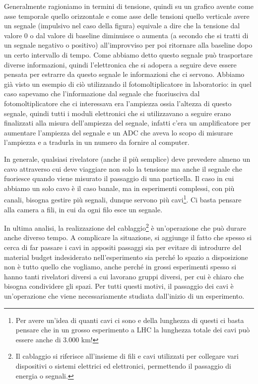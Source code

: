 Generalmente ragioniamo in termini di tensione, quindi su un grafico avente come asse temporale quello orizzontale e come asse delle tensioni quello verticale avere un segnale (impulsivo nel caso della figura) equivale a dire che la tensione dal valore 0 o dal valore di baseline diminuisce o aumenta (a secondo che si tratti di un segnale negativo o positivo) all'improvviso per poi ritornare alla baseline dopo un certo intervallo di tempo. Come abbiamo detto questo segnale può trasportare diverse informazioni, quindi l'elettronica che si adopera a seguire deve essere pensata per estrarre da questo segnale le informazioni che ci servono. Abbiamo già visto un esempio di ciò utilizzando il fotomoltiplicatore in laboratorio: in quel caso sapevamo che l'informazione dal segnale che fuoriusciva dal fotomoltiplicatore che ci interessava era l'ampiezza ossia l'altezza di questo segnale, quindi tutti i moduli elettronici che si utilizzavano a seguire erano finalizzati alla misura dell'ampiezza del segnale, infatti c'era un amplificatore per aumentare l'ampiezza del segnale e un ADC che aveva lo scopo di misurare l'ampiezza e a tradurla in un numero da fornire al computer.

In generale, qualsiasi rivelatore (anche il più semplice) deve prevedere almeno un cavo attraverso cui deve viaggiare non solo la tensione ma anche il segnale che fuoriesce quando viene misurato il passaggio di una particella. Il caso in cui abbiamo un solo cavo è il caso banale, ma in esperimenti complessi, con più canali, bisogna gestire più segnali, dunque servono più cavi\footnote{Per avere un'idea di quanti cavi ci sono e della lunghezza di questi ci basta pensare che in un grosso esperimento a LHC la lunghezza totale dei cavi può essere anche di 3.000 km!}. Ci basta pensare alla camera a fili, in cui da ogni filo esce un segnale.

In ultima analisi, la realizzazione del cablaggio\footnote{Il cablaggio si riferisce all'insieme di fili e cavi utilizzati per collegare vari dispositivi o sistemi elettrici ed elettronici, permettendo il passaggio di energia o segnali.} è un'operazione che può durare anche diverso tempo. A complicare la situazione, si aggiunge il fatto che spesso si cerca di far passare i cavi in appositi passaggi sia per evitare di introdurre del material budget indesiderato nell'esperimento sia perché lo spazio a disposizione non è tutto quello che vogliamo, anche perché in grossi esperimenti spesso si hanno tanti rivelatori diversi a cui lavorano gruppi diversi, per cui è chiaro che bisogna condividere gli spazi. Per tutti questi motivi, il passaggio dei cavi è un'operazione che viene necessariamente studiata dall'inizio di un esperimento.

